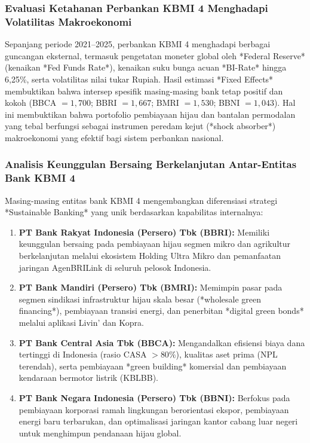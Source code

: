 \documentclass[12pt,a4paper]{article}
\numberwithin{equation}{section}
\begin{document}
\subsubsection{Evaluasi Ketahanan Perbankan KBMI 4 Menghadapi Volatilitas Makroekonomi}
\noindent
Sepanjang periode 2021--2025, perbankan KBMI 4 menghadapi berbagai guncangan eksternal, termasuk pengetatan moneter global oleh *Federal Reserve* (kenaikan *Fed Funds Rate*), kenaikan suku bunga acuan *BI-Rate* hingga 6,25\%, serta volatilitas nilai tukar Rupiah. Hasil estimasi *Fixed Effects* membuktikan bahwa intersep spesifik masing-masing bank tetap positif dan kokoh (BBCA $= 1{,}700$; BBRI $= 1{,}667$; BMRI $= 1{,}530$; BBNI $= 1{,}043$). Hal ini membuktikan bahwa portofolio pembiayaan hijau dan bantalan permodalan yang tebal berfungsi sebagai instrumen peredam kejut (*shock absorber*) makroekonomi yang efektif bagi sistem perbankan nasional.

\subsubsection{Analisis Keunggulan Bersaing Berkelanjutan Antar-Entitas Bank KBMI 4}
\noindent
Masing-masing entitas bank KBMI 4 mengembangkan diferensiasi strategi *Sustainable Banking* yang unik berdasarkan kapabilitas internalnya:
\begin{enumerate}
  \item \textbf{PT Bank Rakyat Indonesia (Persero) Tbk (BBRI):} Memiliki keunggulan bersaing pada pembiayaan hijau segmen mikro dan agrikultur berkelanjutan melalui ekosistem Holding Ultra Mikro dan pemanfaatan jaringan AgenBRILink di seluruh pelosok Indonesia.
  \item \textbf{PT Bank Mandiri (Persero) Tbk (BMRI):} Memimpin pasar pada segmen sindikasi infrastruktur hijau skala besar (*wholesale green financing*), pembiayaan transisi energi, dan penerbitan *digital green bonds* melalui aplikasi Livin' dan Kopra.
  \item \textbf{PT Bank Central Asia Tbk (BBCA):} Mengandalkan efisiensi biaya dana tertinggi di Indonesia (rasio CASA $>80\%$), kualitas aset prima (NPL terendah), serta pembiayaan *green building* komersial dan pembiayaan kendaraan bermotor listrik (KBLBB).
  \item \textbf{PT Bank Negara Indonesia (Persero) Tbk (BBNI):} Berfokus pada pembiayaan korporasi ramah lingkungan berorientasi ekspor, pembiayaan energi baru terbarukan, dan optimalisasi jaringan kantor cabang luar negeri untuk menghimpun pendanaan hijau global.
\end{enumerate}
\end{document}
